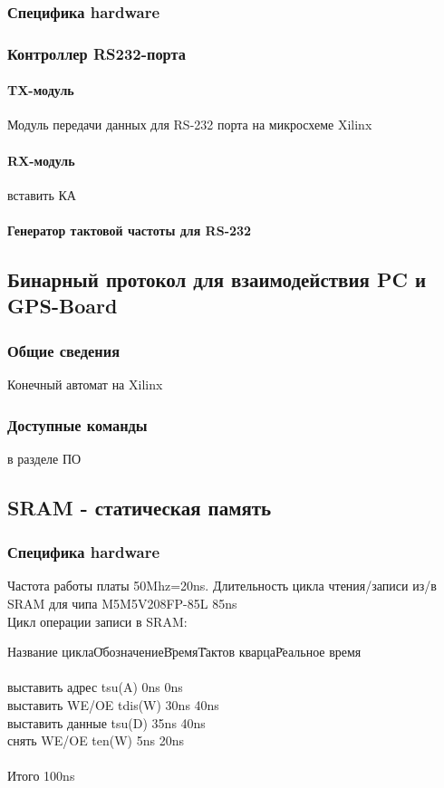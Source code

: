 \subsubsection{Специфика hardware}
\subsubsection{Контроллер RS232-порта}
\paragraph{TX-модуль}
Модуль передачи данных для RS-232 порта на микросхеме Xilinx
\paragraph{RX-модуль}
вставить КА
\paragraph{Генератор тактовой частоты для RS-232}


\subsection{Бинарный протокол для взаимодействия PC и GPS-Board}
\subsubsection{Общие сведения}
Конечный автомат на Xilinx 
\subsubsection{Доступные команды}
в разделе ПО

\subsection{SRAM - статическая память}
\subsubsection{Специфика hardware}
Частота работы платы 50Mhz=20ns. Длительность цикла чтения/записи из/в SRAM для чипа M5M5V208FP-85L 85ns\\

Цикл операции записи в SRAM:
\begin{tabbing}
Название цикла\qquad\=Обозначение\qquad\=Время\qquad\=Тактов кварца\qquad\=Реальное время\\
\\
выставить адрес \> tsu(A) \> 0ns  \> 0ns \\
выставить WE/OE \> tdis(W) \> 30ns  \> 40ns \\
выставить данные \> tsu(D) \> 35ns  \> 40ns \\
снять WE/OE \> ten(W) \> 5ns  \> 20ns \\
\\
Итого \> \>   \> 100ns\\
\end{tabbing}

